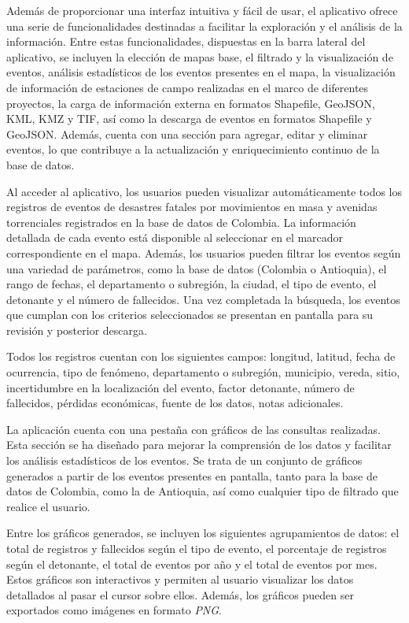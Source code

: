 \documentclass{article}
\begin{document}
Además de proporcionar una interfaz intuitiva y fácil de usar, el aplicativo ofrece una serie de funcionalidades destinadas a facilitar la exploración y el análisis de la información. Entre estas funcionalidades, dispuestas en la barra lateral del aplicativo, se incluyen la elección de mapas base, el filtrado y la visualización de eventos, análisis estadísticos de los eventos presentes en el mapa, la visualización de información de estaciones de campo realizadas en el marco de diferentes proyectos, la carga de información externa en formatos Shapefile, GeoJSON, KML, KMZ y TIF, así como la descarga de eventos en formatos Shapefile y GeoJSON. Además, cuenta con una sección para agregar, editar y eliminar eventos, lo que contribuye a la actualización y enriquecimiento continuo de la base de datos.

Al acceder al aplicativo, los usuarios pueden visualizar automáticamente todos los registros de eventos de desastres fatales por movimientos en masa y avenidas torrenciales registrados en la base de datos de Colombia. La información detallada de cada evento está disponible al seleccionar en el marcador correspondiente en el mapa. Además, los usuarios pueden filtrar los eventos según una variedad de parámetros, como la base de datos (Colombia o Antioquia), el rango de fechas, el departamento o subregión, la ciudad, el tipo de evento, el detonante y el número de fallecidos. Una vez completada la búsqueda, los eventos que cumplan con los criterios seleccionados se presentan en pantalla para su revisión y posterior descarga.

Todos los registros cuentan con los siguientes campos: longitud, latitud, fecha de ocurrencia, tipo de fenómeno, departamento o subregión, municipio, vereda, sitio, incertidumbre en la localización del evento, factor detonante, número de fallecidos, pérdidas económicas, fuente de los datos, notas adicionales.

La aplicación cuenta con una pestaña con gráficos de las consultas realizadas. Esta sección se ha diseñado para mejorar la comprensión de los datos y facilitar los análisis estadísticos de los eventos. Se trata de un conjunto de gráficos generados a partir de los eventos presentes en pantalla, tanto para la base de datos de Colombia, como la de Antioquia, así como cualquier tipo de filtrado que realice el usuario.

Entre los gráficos generados, se incluyen los siguientes agrupamientos de datos: el total de registros y fallecidos según el tipo de evento, el porcentaje de registros según el detonante, el total de eventos por año y el total de eventos por mes. Estos gráficos son interactivos y permiten al usuario visualizar los datos detallados al pasar el cursor sobre ellos. Además, los gráficos pueden ser exportados como imágenes en formato \textit{PNG}.
\end{document}
